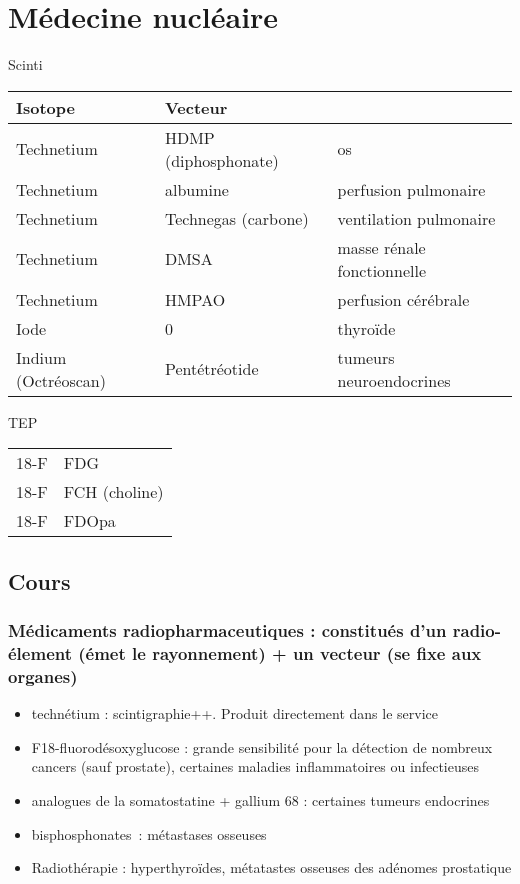 \documentclass[11pt]{article}
\begin{document}
\section{Médecine nucléaire}
\label{sec:org36f70f4}
Scinti
\begin{center}
\begin{tabular}{lll}
Isotope & Vecteur & \\
\hline
Technetium & HDMP (diphosphonate) & os\\
Technetium & albumine & perfusion pulmonaire\\
Technetium & Technegas (carbone) & ventilation pulmonaire\\
Technetium & DMSA & masse rénale fonctionnelle\\
Technetium & HMPAO & perfusion cérébrale\\
\hline
Iode & 0 & thyroïde\\
\hline
Indium  (Octréoscan) & Pentétréotide & tumeurs neuroendocrines\\
\end{tabular}
\end{center}
TEP
\begin{center}
\begin{tabular}{ll}
18-F & FDG\\
18-F & FCH (choline)\\
18-F & FDOpa\\
\end{tabular}
\end{center}
\subsection{Cours}
\label{sec:orga764ca9}
\subsubsection{Médicaments radiopharmaceutiques : constitués d'un radio-élement (émet le rayonnement) + un vecteur (se fixe aux organes)}
\label{sec:org8df29e6}
\begin{itemize}
\item technétium : scintigraphie++. Produit directement dans le service
\item F18-fluorodésoxyglucose : grande sensibilité pour la détection de nombreux
cancers (sauf prostate), certaines maladies inflammatoires ou infectieuses
\item analogues de la somatostatine + gallium 68 : certaines tumeurs endocrines
\item bisphosphonates : métastases osseuses
\item Radiothérapie : hyperthyroïdes, métatastes osseuses des adénomes prostatique
\end{itemize}
\end{document}
